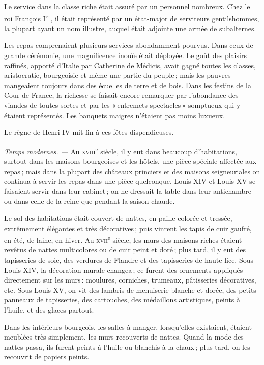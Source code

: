 Le service dans la classe riche était assuré par un personnel nombreux. Chez le
roi François I\textsuperscript{er}, il était représenté par un état-major de
{\mmm} serviteurs gentilshommes, la plupart ayant un nom illustre, auquel
était adjointe une armée de subalternes.

Les repas comprenaient plusieurs services abondamment pourvus. Dans ceux de
grande cérémonie, une magnificence inouïe était déployée. Le goût des plaisirs
raffinés, apporté d'Italie par Catherine de Médicis, avait gagné toutes les
classes, aristocratie, bourgeoisie et même une partie du peuple ; mais les
pauvres mangeaient toujours dans des écuelles de terre et de bois. Dans les
festins de la Cour de France, la richesse se faisait encore remarquer par
l'abondance des viandes de toutes sortes et par les « entremets-spectacles »
somptueux qui y étaient représentés. Les banquets maigres n'étaient pas moins
luxueux.

Le règne de Henri IV mit fin à ces fêtes dispendieuses.

\sk

\textit{Temps modernes. —} Au \textsc{xviii}\textsuperscript{e} siècle, il
y eut dans beaucoup d'habitations, surtout dans les maisons bourgeoises et les
hôtels, une pièce spéciale affectée aux repas ; mais dans la plupart des
châteaux princiers et des maisons seigneuriales on continua à servir les repas
dans une pièce quelconque. Louis XIV et Louis XV se faisaient servir dans leur
cabinet ; on ne dressait la table dans leur antichambre ou dans celle de la
reine que pendant la saison chaude.

Le sol des habitations était couvert de nattes, en paille colorée et tressée,
extrêmement élégantes et très décoratives ; puis vinrent les tapis de cuir
gaufré, en été, de laine, en hiver. Au \textsc{xvii}\textsuperscript{e} siècle,
les murs des maisons riches étaient revêtus de nattes multicolores ou de cuir
peint et doré ; plus tard, il y eut des tapisseries de soie, des verdures de
Flandre et des tapisseries de haute lice. Sous Louis XIV, la décoration murale
changea ; ce furent des ornements appliqués directement sur les murs :
moulures, corniches, trumeaux, pâtisseries décoratives, etc. Sous Louis XV, on
vit des lambris de menuiserie blanche et dorée, des petits panneaux de
tapisseries, des cartouches, des médaillons artistiques, peints à l'huile, et
des glaces partout.

Dans les intérieurs bourgeois, les salles à manger, lorsqu'elles existaient,
étaient meublées très simplement, les murs recouverts de nattes. Quand la mode
des nattes passa, ils furent peints à l'huile ou blanchis à la chaux ; plus
tard, on les recouvrit de papiers peints.

